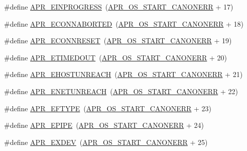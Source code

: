 \begin{DoxyCompactItemize}
\item 
\#define \hyperlink{group___a_p_r___error_ga5c311361f4f68f289c90f3cdfd77eb79}{A\+P\+R\+\_\+\+E\+I\+N\+P\+R\+O\+G\+R\+E\+SS}~(\hyperlink{group__apr__errno_ga7bca957c11b80b31cb54b0d2cbe9e025}{A\+P\+R\+\_\+\+O\+S\+\_\+\+S\+T\+A\+R\+T\+\_\+\+C\+A\+N\+O\+N\+E\+RR} + 17)
\item 
\#define \hyperlink{group___a_p_r___error_ga9458da18e0ee46a5d37c9cdfdc43efd2}{A\+P\+R\+\_\+\+E\+C\+O\+N\+N\+A\+B\+O\+R\+T\+ED}~(\hyperlink{group__apr__errno_ga7bca957c11b80b31cb54b0d2cbe9e025}{A\+P\+R\+\_\+\+O\+S\+\_\+\+S\+T\+A\+R\+T\+\_\+\+C\+A\+N\+O\+N\+E\+RR} + 18)
\item 
\#define \hyperlink{group___a_p_r___error_ga264bfe2056e917728e9ed060b58869c2}{A\+P\+R\+\_\+\+E\+C\+O\+N\+N\+R\+E\+S\+ET}~(\hyperlink{group__apr__errno_ga7bca957c11b80b31cb54b0d2cbe9e025}{A\+P\+R\+\_\+\+O\+S\+\_\+\+S\+T\+A\+R\+T\+\_\+\+C\+A\+N\+O\+N\+E\+RR} + 19)
\item 
\#define \hyperlink{group___a_p_r___error_ga6aeccbe9accb34f0adc1cb1ab9a82a8d}{A\+P\+R\+\_\+\+E\+T\+I\+M\+E\+D\+O\+UT}~(\hyperlink{group__apr__errno_ga7bca957c11b80b31cb54b0d2cbe9e025}{A\+P\+R\+\_\+\+O\+S\+\_\+\+S\+T\+A\+R\+T\+\_\+\+C\+A\+N\+O\+N\+E\+RR} + 20)
\item 
\#define \hyperlink{group___a_p_r___error_ga489b0c02fa7cf33ed6d698d385661f86}{A\+P\+R\+\_\+\+E\+H\+O\+S\+T\+U\+N\+R\+E\+A\+CH}~(\hyperlink{group__apr__errno_ga7bca957c11b80b31cb54b0d2cbe9e025}{A\+P\+R\+\_\+\+O\+S\+\_\+\+S\+T\+A\+R\+T\+\_\+\+C\+A\+N\+O\+N\+E\+RR} + 21)
\item 
\#define \hyperlink{group___a_p_r___error_gab9b7124a88817d1b69cdef059f7dc689}{A\+P\+R\+\_\+\+E\+N\+E\+T\+U\+N\+R\+E\+A\+CH}~(\hyperlink{group__apr__errno_ga7bca957c11b80b31cb54b0d2cbe9e025}{A\+P\+R\+\_\+\+O\+S\+\_\+\+S\+T\+A\+R\+T\+\_\+\+C\+A\+N\+O\+N\+E\+RR} + 22)
\item 
\#define \hyperlink{group___a_p_r___error_gac358701354d03c37e3f0de12ed6d9afc}{A\+P\+R\+\_\+\+E\+F\+T\+Y\+PE}~(\hyperlink{group__apr__errno_ga7bca957c11b80b31cb54b0d2cbe9e025}{A\+P\+R\+\_\+\+O\+S\+\_\+\+S\+T\+A\+R\+T\+\_\+\+C\+A\+N\+O\+N\+E\+RR} + 23)
\item 
\#define \hyperlink{group___a_p_r___error_gae985330e30e374714ff1742485597f5d}{A\+P\+R\+\_\+\+E\+P\+I\+PE}~(\hyperlink{group__apr__errno_ga7bca957c11b80b31cb54b0d2cbe9e025}{A\+P\+R\+\_\+\+O\+S\+\_\+\+S\+T\+A\+R\+T\+\_\+\+C\+A\+N\+O\+N\+E\+RR} + 24)
\item 
\#define \hyperlink{group___a_p_r___error_ga0562023bd8ebe580b9bbb9f7b04d3f5d}{A\+P\+R\+\_\+\+E\+X\+D\+EV}~(\hyperlink{group__apr__errno_ga7bca957c11b80b31cb54b0d2cbe9e025}{A\+P\+R\+\_\+\+O\+S\+\_\+\+S\+T\+A\+R\+T\+\_\+\+C\+A\+N\+O\+N\+E\+RR} + 25)

\end{DoxyCompactItemize}
